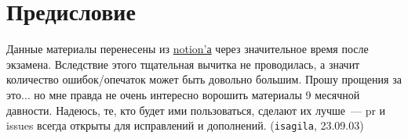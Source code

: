 \section*{Предисловие}

Данные материалы перенесены из
\href{https://awes0me.notion.site/EX-01-c7434ef4efff4e898b176c418202c956?pvs=4}
{notion'а} через значительное время после экзамена. Вследствие этого тщательная
вычитка не проводилась, а значит количество ошибок/опечаток может быть довольно
большим. Прошу прощения за это\(\dotsc\) но мне правда не очень интересно
ворошить материалы 9 месячной давности. Надеюсь, те, кто будет ими пользоваться,
сделают их лучше~--- pr и issues всегда открыты для исправлений и дополнений.
(\texttt{isagila}, 23.09.03)
